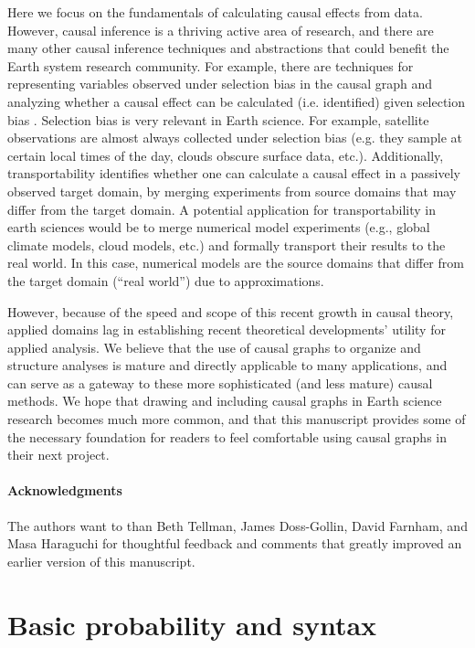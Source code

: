 \documentclass[12pt]{article}
\begin{document}
Here we focus on the fundamentals of calculating causal effects from
data. However, causal inference is a thriving active area of research,
and there are many other causal inference techniques and abstractions
that could benefit the Earth system research community. For example,
there are techniques for representing variables observed under
selection bias in the causal graph and analyzing whether a causal
effect can be calculated (i.e. identified) given selection bias
\citep[e.g.,][]{bareinboim2014recovering}. Selection bias is very
relevant in Earth science. For example, satellite observations are
almost always collected under selection bias (e.g. they sample at
certain local times of the day, clouds obscure surface data,
etc.). Additionally, transportability
\citep[e.g.,][]{bareinboim2012transportability} identifies whether one
can calculate a causal effect in a passively observed target domain,
by merging experiments from source domains that may differ from the
target domain. A potential application for transportability in earth
sciences would be to merge numerical model experiments (e.g., global
climate models, cloud models, etc.) and formally transport their
results to the real world. In this case, numerical models are the
source domains that differ from the target domain (``real world'') due
to approximations.

However, because of the speed and scope of this recent growth in
causal theory, applied domains lag in establishing recent theoretical
developments' utility for applied analysis. We believe that the use of
causal graphs to organize and structure analyses is mature and
directly applicable to many applications, and can serve as a gateway
to these more sophisticated (and less mature) causal methods. We hope
that drawing and including causal graphs in Earth science research
becomes much more common, and that this manuscript provides some of
the necessary foundation for readers to feel comfortable using causal
graphs in their next project.

\paragraph{Acknowledgments} The authors want to than Beth Tellman,
James Doss-Gollin, David Farnham, and Masa Haraguchi for thoughtful
feedback and comments that greatly improved an earlier version of this
manuscript.




\appendix
\section{Basic probability and syntax}
\label{prob-theory}
\end{document}
